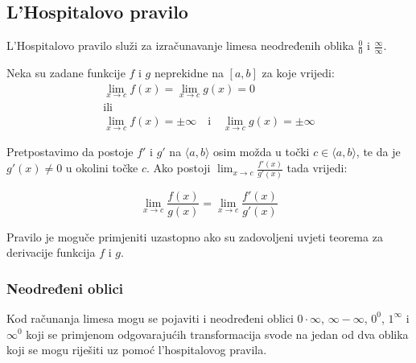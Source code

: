 \subsection{L'Hospitalovo pravilo}

L'Hospitalovo pravilo služi za izračunavanje limesa neodređenih oblika $\frac{0}{0}$
i $\frac{\infty}{\infty}$.

\begin{definition}
    \label{def:lhospital}

    Neka su zadane funkcije $f$ i $g$ neprekidne na $[a,b]$ za koje vrijedi:
    \begin{gather*}
        \lim_{x\to c}f(x) = \lim_{x\to c}g(x) = 0\\
        \text{ili}\\
        \lim_{x\to c}f(x) = \pm\infty\quad\text{i}\quad\lim_{x\to c}g(x)=\pm\infty
    \end{gather*}

    Pretpostavimo da postoje $f'$ i $g'$ na $\langle a,b\rangle$ osim možda u točki $c\in\langle a,b\rangle$,
    te da je $g'(x)\neq 0$ u okolini točke $c$. Ako postoji $\lim_{x\to c}\frac{f'(x)}{g'(x)}$ tada vrijedi:

    \center
    \begin{equation*}
        \lim_{x\to c}\frac{f(x)}{g(x)} = \lim_{x\to c}\frac{f'(x)}{g'(x)}
    \end{equation*}
\end{definition}

Pravilo je moguče primjeniti uzastopno ako su zadovoljeni uvjeti teorema za
derivacije funkcija $f$ i $g$.

\subsubsection{Neodređeni oblici}

Kod računanja limesa mogu se pojaviti i neodređeni oblici $0\cdot\infty$, $\infty - \infty$,
$0^0$, $1^\infty$ i $\infty^0$ koji se primjenom odgovarajućih transformacija svode na
jedan od dva oblika koji se mogu riješiti uz pomoć l'hospitalovog pravila.

